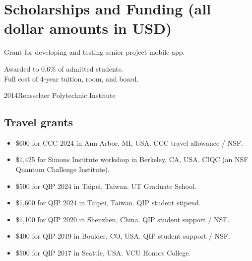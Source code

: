 \documentclass[11pt,letterpaper,serif]{moderncv}
\begin{document}
\section{Scholarships and Funding \hfill{\footnotesize (all dollar amounts in USD)}}


{
	\begin{adjustwidth}{.25in}{}
		Grant for developing and testing senior project mobile app.
	\end{adjustwidth}
}

{
	\begin{adjustwidth}{.25in}{}
		Awarded to 0.6\% of admitted students.\\
		Full cost of 4-year tuition, room, and board.
	\end{adjustwidth}
}


 {2014}{Rensselaer Polytechnic Institute}{}

\subsection{Travel grants}

\begin{itemize}
	\item \$600 for CCC 2024 in Ann Arbor, MI, USA. CCC travel allowance / NSF.
	\item \$1,425 for Simons Institute workshop in Berkeley, CA, USA. CIQC (an NSF Quantum Challenge Institute).
	\item \$500 for QIP 2024 in Taipei, Taiwan. UT Graduate School.
	\item \$1,600 for QIP 2024 in Taipei, Taiwan. QIP student stipend.
	\item \$1,100 for QIP 2020 in Shenzhen, China. QIP student support / NSF.
	\item \$400 for QIP 2019 in Boulder, CO, USA. QIP student support / NSF.
	\item \$500 for QIP 2017 in Seattle, USA. VCU Honors College.
\end{itemize}
\end{document}
